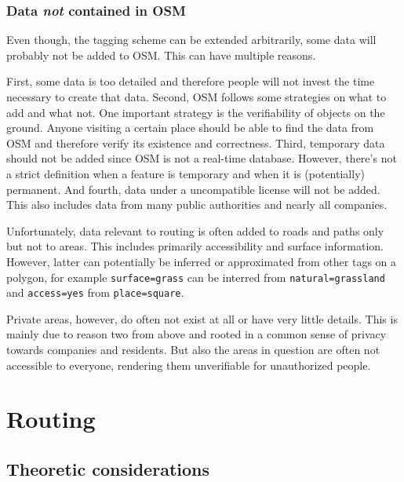 			
		\subsubsection{Data \textit{not} contained in OSM}
		
			Even though, the tagging scheme can be extended arbitrarily, some data will probably not be added to OSM.
			This can have multiple reasons.
			
			First, some data is too detailed and therefore people will not invest the time necessary to create that data.
			Second, OSM follows some strategies on what to add and what not.
			One important strategy is the verifiability of objects on the ground.
			Anyone visiting a certain place should be able to find the data from OSM and therefore verify its existence and correctness.
			Third, temporary data should not be added since OSM is not a real-time database.
			However, there's not a strict definition when a feature is temporary and when it is (potentially) permanent.
			And fourth, data under a uncompatible license will not be added.
			This also includes data from many public authorities and nearly all companies.
			
			Unfortunately, data relevant to routing is often added to roads and paths only but not to areas.
			This includes primarily accessibility and surface information.
			However, latter can potentially be inferred or approximated from other tags on a polygon, for example \texttt{surface=grass} can be interred from \texttt{natural=grassland} and \texttt{access=yes} from \texttt{place=square}.
			
			Private areas, however, do often not exist at all or have very little details.
			This is mainly due to reason two from above and rooted in a common sense of privacy towards companies and residents.
			But also the areas in question are often not accessible to everyone, rendering them unverifiable for unauthorized people.

\section{Routing}

	
	\subsection{Theoretic considerations}
	\label{subsec:routing-theoretic-considerations}
	
